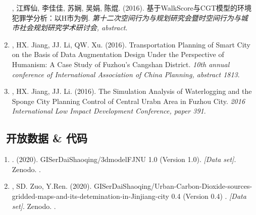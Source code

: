 \begin{enumerate}
    {}, 江辉仙, 李佳佳, 苏娴, 吴娟, 陈焜. (2016).
    基于WalkScore与CGT模型的环境犯罪学分析：以H市为例.
    \textit{第十二次空间行为与规划研究会暨时空间行为与城市社会规划研究学术研讨会, abstract}.
\item
    \Shaoqing, HX. Jiang, JJ. Li, QW. Xu. (2016).
    Transportation Planning of Smart City on the Basis of Data Augmentation Design Under the Perspective of Humanism: A Case Study of Fuzhou's Cangshan District.
    \textit{10th annual conference of International Association of China Planning, abstract 1813}.
\item
   \Shaoqing, HX. Jiang, JJ. Li. (2016).
    The Simulation Analysis of Waterlogging and the Sponge City Planning Control of Central Urabn Area in Fuzhou City.
    \textit{2016 International Low Impact Development Conference, paper 391}.
\end{enumerate}

\subsection*{\texorpdfstring{\faBook\ 开放数据 \& 代码}{开放数据 \& 代码}}
\begin{enumerate}
\item
   \Shaoqing. (2020).
    GISerDaiShaoqing/3dmodelFJNU 1.0 (Version 1.0).
    \textit{[Data set]}. Zenodo. 
    .
\item
   \Shaoqing, SD. Zuo, Y.Ren. (2020).
    GISerDaiShaoqing/Urban-Carbon-Dioxide-sources-gridded-maps-and-its-detemination-in-Jinjiang-city 0.4 (Version 0.4) .
    \textit{[Data set]}. Zenodo. 
    .
\end{enumerate}

